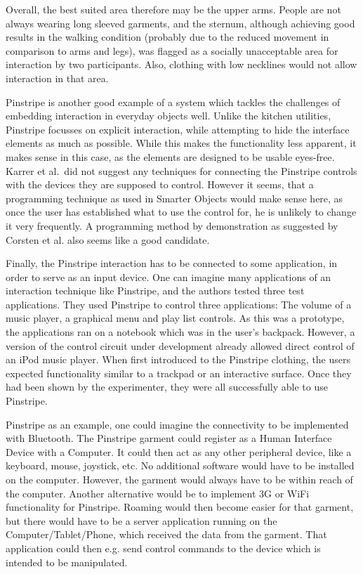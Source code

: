 Overall, the best suited area therefore may be the upper arms.
People are not always wearing long sleeved garments, and the sternum, although achieving good results in the walking condition (probably due to the reduced movement in comparison to arms and legs), was flagged as a socially unacceptable area for interaction by two participants.
Also, clothing with low necklines  would not allow interaction in that area.

Pinstripe is another good example of a system which tackles the challenges of embedding interaction in everyday objects well.
Unlike the kitchen utilities, Pinstripe focusses on explicit interaction, while attempting to hide the interface elements as much as possible.
While this makes the functionality less apparent, it makes sense in this case, as the elements are designed to be usable eyes-free.
Karrer et al.\ did not suggest any techniques for connecting the Pinstripe controls with the devices they are supposed to control.
However it seems, that a programming technique as used in Smarter Objects \cite{heun13smarter} would make sense here, as once the user has established what to use the control for, he is unlikely to change it very frequently.
A programming method by demonstration \cite{corsten13} as suggested by Corsten et al. also seems like a good candidate.

Finally, the Pinstripe interaction has to be connected to some application, in order to serve as an input device.
One can imagine many applications of an interaction technique like Pinstripe, and the authors tested three test applications.
They used Pinstripe to control three applications: The volume of a music player, a graphical menu and play list controls. 
As this was a prototype, the applications ran on a notebook which was in the user's backpack.
However, a version of the control circuit under development already allowed direct control of an iPod music player.
When first introduced to the Pinstripe clothing, the users expected functionality similar to a trackpad or an interactive surface. Once they had been shown by the experimenter, they were all successfully able to use Pinstripe.

Pinstripe as an example, one could imagine the connectivity to be implemented with Bluetooth.
The Pinstripe garment could register as a Human Interface Device with a Computer.
It could then act as any other peripheral device, like a keyboard, mouse, joystick, etc. 
No additional software would have to be installed on the computer. 
However, the garment would always have to be within reach of the computer.
Another alternative would be to implement 3G or WiFi functionality for Pinstripe.
Roaming would then become easier for that garment, but there would have to be a server application running on the Computer/Tablet/Phone, which received the data from the garment. 
That application could then e.g. send control commands to the device which is intended to be manipulated.

